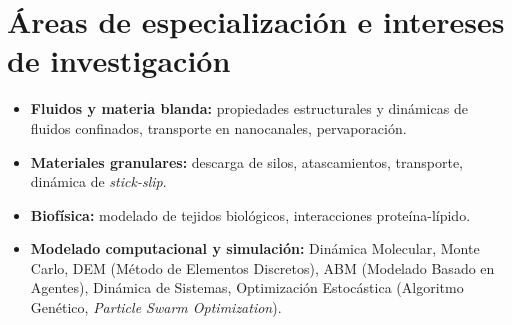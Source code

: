
\vspace{1.0em}
\hrulefill \vspace{-1.5em}
\section*{Áreas de especialización e intereses de investigación}

\begin{itemize}
	\item \textbf{Fluidos y materia blanda:} propiedades estructurales y dinámicas de fluidos confinados, transporte en nanocanales, pervaporación.
	\item \textbf{Materiales granulares:} descarga de silos, atascamientos, transporte, dinámica de \textit{stick-slip}.
	\item \textbf{Biofísica:} modelado de tejidos biológicos, interacciones proteína-lípido.
	\item \textbf{Modelado computacional y simulación:} Dinámica Molecular, Monte Carlo, DEM (Método de Elementos Discretos), ABM (Modelado Basado en Agentes), Dinámica de Sistemas, Optimización Estocástica (Algoritmo Genético, \textit{Particle Swarm Optimization}).
\end{itemize}
